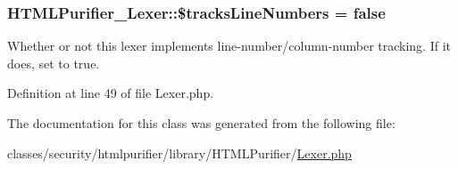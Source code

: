 \hypertarget{classHTMLPurifier__Lexer_acd246fb6f67bd3043b18553b04db93ed}{
\subsubsection[{\$tracks\+Line\+Numbers}]{\setlength{\rightskip}{0pt plus 5cm}H\+T\+M\+L\+Purifier\+\_\+\+Lexer\+::\$tracks\+Line\+Numbers = false}}\label{classHTMLPurifier__Lexer_acd246fb6f67bd3043b18553b04db93ed}
Whether or not this lexer implements line-\/number/column-\/number tracking. If it does, set to true. 

Definition at line 49 of file Lexer.\+php.



The documentation for this class was generated from the following file\+:\begin{DoxyCompactItemize}
\item 
classes/security/htmlpurifier/library/\+H\+T\+M\+L\+Purifier/\hyperlink{Lexer_8php}{Lexer.\+php}\end{DoxyCompactItemize}
